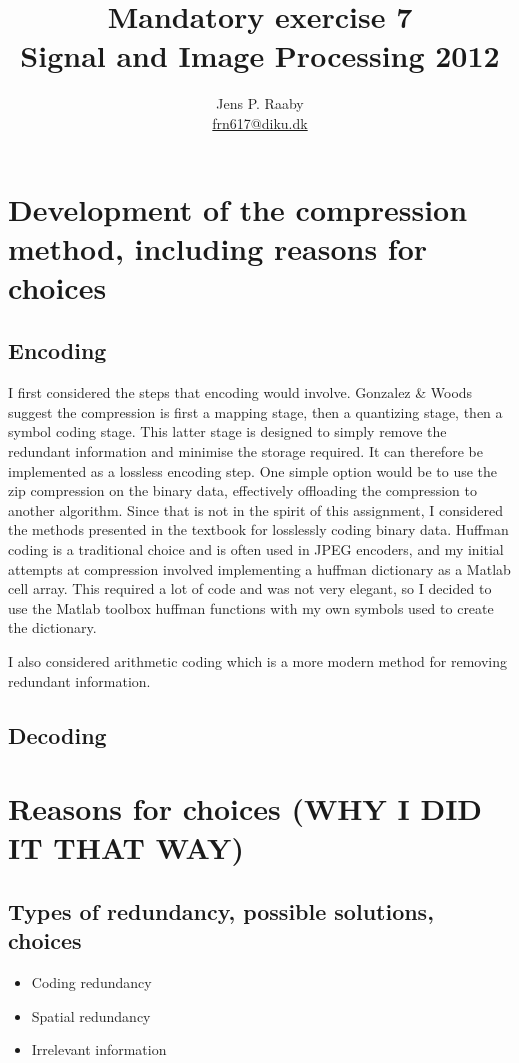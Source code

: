 \documentclass[a4paper]{article}
\title{Mandatory exercise 7 \\
Signal and Image Processing 2012}
\author{Jens P. Raaby \\
\url{frn617@diku.dk}}
\begin{document}
 
\maketitle

\section{Development of the compression method, including reasons for choices}
\subsection{Encoding}
I first considered the steps that encoding would involve. Gonzalez \& Woods suggest the compression is first a mapping stage, then a quantizing stage, then a symbol coding stage. This latter stage is designed to simply remove the redundant information and minimise the storage required. It can therefore be implemented as a lossless encoding step. One simple option would be to use the zip compression on the binary data, effectively offloading the compression to another algorithm. Since that is not in the spirit of this assignment, I considered the methods presented in the textbook for losslessly coding binary data. Huffman coding is a traditional choice and is often used in JPEG encoders, and my initial attempts at compression involved implementing a huffman dictionary as a Matlab cell array. This required a lot of code and was not very elegant, so I decided to use the Matlab toolbox huffman functions with my own symbols used to create the dictionary.

I also considered arithmetic coding which is a more modern method for removing redundant information. 

\subsection{Decoding}


\section{Reasons for choices (WHY I DID IT THAT WAY)}
\subsection{Types of redundancy, possible solutions, choices}
\begin{itemize}

    \item Coding redundancy


    \item Spatial redundancy


    \item Irrelevant information
\end{itemize}
\end{document}
